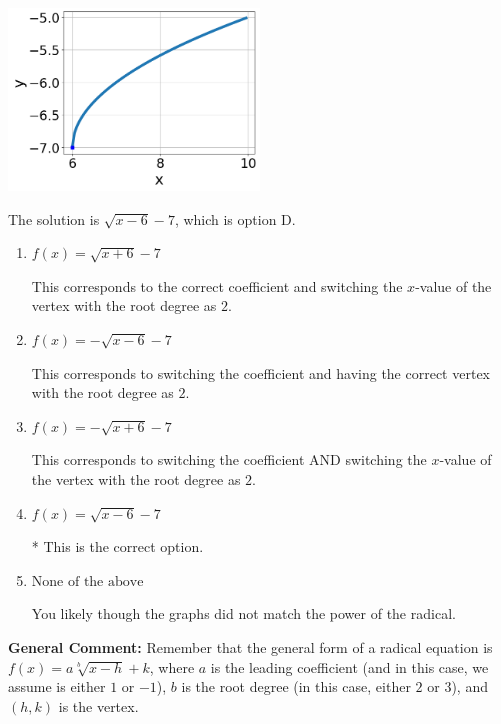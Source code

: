 \documentclass{extbook}[14pt]
\begin{document}
\begin{enumerate}
{\begin{center}
    \includegraphics[width=0.5\textwidth]{../Figures/radicalGraphToEquationCopyC.png}
\end{center}




The solution is \( \sqrt{x - 6} - 7 \), which is option D.\begin{enumerate}[label=\Alph*.]
\item \( f(x) = \sqrt{x + 6} - 7 \)

This corresponds to the correct coefficient and switching the $x$-value of the vertex with the root degree as $2$.
\item \( f(x) = - \sqrt{x - 6} - 7 \)

This corresponds to switching the coefficient and having the correct vertex with the root degree as $2$.
\item \( f(x) = - \sqrt{x + 6} - 7 \)

This corresponds to switching the coefficient AND switching the $x$-value of the vertex with the root degree as $2$.
\item \( f(x) = \sqrt{x - 6} - 7 \)

* This is the correct option.
\item \( \text{None of the above} \)

You likely though the graphs did not match the power of the radical.
\end{enumerate}

\textbf{General Comment:} Remember that the general form of a radical equation is $ f(x) = a \sqrt[b]{x - h} + k$, where $a$ is the leading coefficient (and in this case, we assume is either $1$ or $-1$), $b$ is the root degree (in this case, either $2$ or $3$), and $(h, k)$ is the vertex.
}
\end{enumerate}
\end{document}
